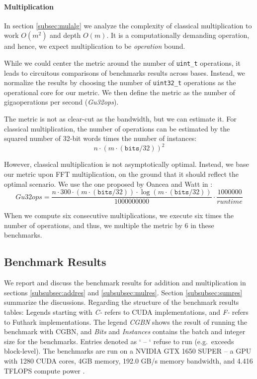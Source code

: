 \paragraph{Multiplication}
In section \ref{subsec:mulalg} we analyze the complexity of classical
multiplication to work $O(m^2)$ and depth $O(m)$. It is a computationally
demanding operation, and hence, we expect multiplication to be
\textit{operation} bound.

While we could center the metric around the number of \texttt{uint\_t}
operations, it leads to circuitous comparisons of benchmarks results across
bases. Instead, we normalize the results by choosing the number of
\texttt{uint32\_t} operations as the operational core for our metric. We then
define the metric as the number of gigaoperations per second (\textit{Gu32ops}).

The metric is not as clear-cut as the bandwidth, but we can estimate it. For
classical multiplication, the number of operations can be estimated by the
squared number of 32-bit words times the number of instances:
\begin{equation}
  \label{eq:u32opsobs}
  {n \cdot (m \cdot (\mathtt{bits} / 32))^2}
\end{equation}

However, classical multiplication is not asymptotically optimal. Instead, we
base our metric upon FFT multiplication, on the ground that it should reflect
the optimal scenario. We use the one proposed by Oancea and Watt in
\cite{oancea2024gpu}:
\begin{equation}
  \label{eq:u32ops}
  \mathit{Gu32ops} = \dfrac{n \cdot 300 \cdot (m \cdot (\mathtt{bits} / 32)) \cdot \log (m \cdot (\mathtt{bits} / 32))}{1000000000} \cdot \dfrac{1000000}{\mathit{runtime}}
\end{equation}

When we compute six consecutive multiplications, we execute six times the number
of operations, and thus, we multiple the metric by 6 in these benchmarks.

\subsection{Benchmark Results}
\label{subsec:benchres}

We report and discuss the benchmark results for addition and multiplication in
sections \ref{subsubsec:addres} and \ref{subsubsec:mulres}. Section
\ref{subsubsec:sumres} summarize the discussions. Regarding the structure of the
benchmark results tables: Legends starting with \textit{C-} refers to CUDA
implementations, and \textit{F-} refers to Futhark implementations. The legend
\textit{CGBN} shows the result of running the benchmark with CGBN, and
\textit{Bits} and \textit{Instances} contains the batch and integer size for the
benchmarks. Entries denoted as ` -- ` refuse to run (e.g.\ exceeds
block-level). The benchmarks are run on a NVIDIA GTX 1650 SUPER -- a GPU with
1280 CUDA cores, 4GB memory, 192.0 GB/s memory bandwidth, and 4.416 TFLOPS
compute power \cite{gpuspecs}.

